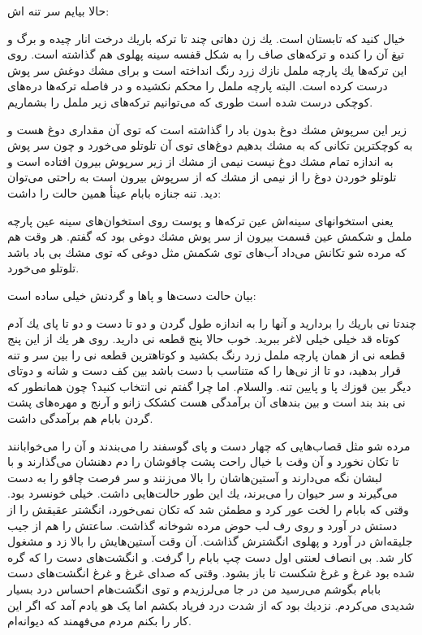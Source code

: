 \documentclass[12pt,a4paper]{book}
\begin{document}
حالا بیایم سر تنه اش:

خیال کنید که تابستان است. يك زن دهاتی چند تا ترکه باريك درخت انار چیده و برگ و تیغ آن را کنده و ترکه‌های صاف را به شکل قفسه سینه پهلوی هم گذاشته است. روی این ترکه‌ها يك پارچه ململ نازك زرد رنگ انداخته است و برای مشك دوغش سر پوش درست کرده است. البته پارچه ململ را محکم نکشیده و در فاصله ترکه‌ها دره‌های کوچکی درست شده است طوری که می‌توانیم ترکه‌های زیر ململ را بشماریم.

زیر این سرپوش مشك دوغ بدون باد را گذاشته است که توی آن مقداری دوغ هست و به کوچکترین تکانی که به مشك بدهیم دوغ‌های توی آن تلوتلو می‌خورد و چون سر پوش به اندازه تمام مشك دوغ نیست نیمی از مشك از زیر سرپوش بیرون افتاده است و تلوتلو خوردن دوغ را از نیمی از مشك که از سرپوش بيرون است به راحتی می‌توان دید. تنه جنازه بابام عينأ همین حالت را داشت:

 یعنی استخوانهای سینه‌اش عین ترکه‌ها و پوست روی استخوان‌های سینه عین پارچه ململ و شکمش عين قسمت بیرون از سر پوش مشك دوغی بود که گفتم. هر وقت هم که مرده شو تكانش می‌داد آب‌های توی شکمش مثل دوغی که توی مشك بی باد باشد تلوتلو می‌خورد.

بیان حالت دست‌ها و پاها و گردنش خیلی ساده است: 

چندتا نی باريك را بردارید و آنها را به اندازه طول گردن و دو تا دست و دو تا پای يك آدم کوتاه قد خیلی خیلی لاغر ببرید. خوب حالا پنج قطعه نی دارید. روی هر يك از این پنج قطعه نی از همان پارچه ململ زرد رنگ بکشید و کوتاهترین قطعه نی را بین سر و تنه قرار بدهید، دو تا از نی‌ها را که متناسب با دست باشد بین کف دست و شانه و دوتای دیگر بین قوزك پا و پایین تنه. والسلام. اما چرا گفتم نی انتخاب کنید؟ چون همانطور که نی بند بند است و بین بندهای آن برآمدگی هست کشکک زانو و آرنج و مهره‌های پشت گردن بابام هم برآمدگی داشت.

مرده شو مثل قصاب‌هایی که چهار دست و پای گوسفند را می‌بندند و آن را می‌خوابانند تا تکان نخورد و آن وقت با خیال راحت پشت چاقوشان را دم دهنشان می‌گذارند و با لبشان نگه می‌دارند و آستین‌هاشان را بالا می‌زنند و سر فرصت چاقو را به دست می‌گیرند و سر حیوان را می‌برند، يك این طور حالت‌هایی داشت. خیلی خونسرد بود. وقتی که بابام را لخت عور کرد و مطمئن شد که تکان نمی‌خورد، انگشتر عقیقش را از
دستش در آورد و روی رف لب حوض مرده شوخانه گذاشت. ساعتش را هم از جیب جلیقه‌اش در آورد و پهلوی انگشترش گذاشت. آن وقت آستین‌هایش را بالا زد و مشغول کار شد. بی انصاف لعنتی اول دست چپ بابام را گرفت. و انگشت‌های دست را که گره شده بود غرغ و غرغ شکست تا باز بشود. وقتی که صدای غرغ و غرغ انگشت‌های دست بابام بگوشم می‌رسید من در جا می‌لرزیدم و توی انگشت‌هام احساس درد بسیار شدیدی می‌کردم. نزديك بود که از شدت درد فریاد بکشم اما یک هو یادم آمد که اگر این کار را بکنم مردم می‌فهمند که دیوانه‌ام.
\end{document}

